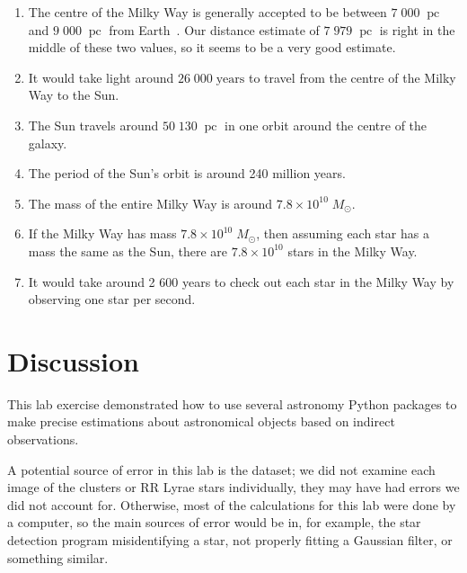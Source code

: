 \documentclass[11pt]{article}
\DeclareMathOperator{\pc}{pc}
\begin{document}
\begin{enumerate}[label={\textbf{\emph{(\arabic*)}}}]
	\item %
The centre of the Milky Way is generally accepted to be between $7\;000\;\pc$ and $9\;000\;\pc$ from Earth~\cite{milky-way-dist}.
Our distance estimate of $7\;979\;\pc$ is right in the middle of these two values, so it seems to be a very good estimate.

	\item %
It would take light around $26\;000\;\textrm{years}$ to travel from the centre of the Milky Way to the Sun.

	\item %
The Sun travels around $50\;130\;\pc$ in one orbit around the centre of the galaxy.

	\item %
The period of the Sun's orbit is around 240 million years.

	\item %
The mass of the entire Milky Way is around $7.8 \times 10^{10}\;M_\odot$.

	\item %
If the Milky Way has mass $7.8 \times 10^{10}\;M_\odot$, then assuming each star has a mass the same as the Sun, there are $7.8 \times 10^{10}$ stars in the Milky Way.

	\item %
It would take around 2 600 years to check out each star in the Milky Way by observing one star per second.

\end{enumerate}


\section{Discussion}
This lab exercise demonstrated how to use several astronomy Python packages to make precise estimations about astronomical objects based on indirect observations.

A potential source of error in this lab is the dataset; we did not examine each image of the clusters or RR Lyrae stars individually, they may have had errors we did not account for.
Otherwise, most of the calculations for this lab were done by a computer, so the main sources of error would be in, for example, the star detection program misidentifying a star, not properly fitting a Gaussian filter, or something similar.
\end{document}
